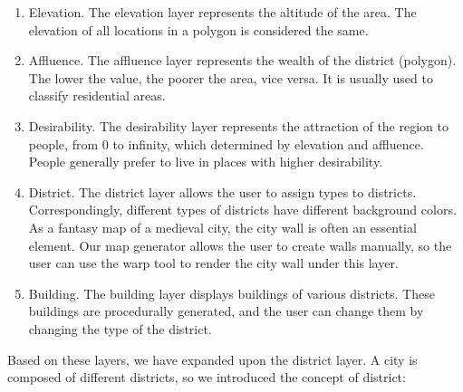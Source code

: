 \begin{enumerate}
  \item Elevation. The elevation layer represents the altitude of the area. The elevation of all locations in a polygon is considered the same.
  \item Affluence. The affluence layer represents the wealth of the district (polygon). The lower the value, the poorer the area, vice versa. It is usually used to classify residential areas.
  \item Desirability. The desirability layer represents the attraction of the region to people, from 0 to infinity, which determined by elevation and affluence. People generally prefer to live in places with higher desirability.
  \item District. The district layer allows the user to assign types to districts. Correspondingly, different types of districts have different background colors. As a fantasy map of a medieval city, the city wall is often an essential element. Our map generator allows the user to create walls manually, so the user can use the warp tool to render the city wall under this layer.
  \item Building. The building layer displays buildings of various districts. These buildings are procedurally generated, and the user can change them by changing the type of the district.
\end{enumerate}

Based on these layers, we have expanded upon the district layer. A city is composed of different districts, so we introduced the concept of district:

